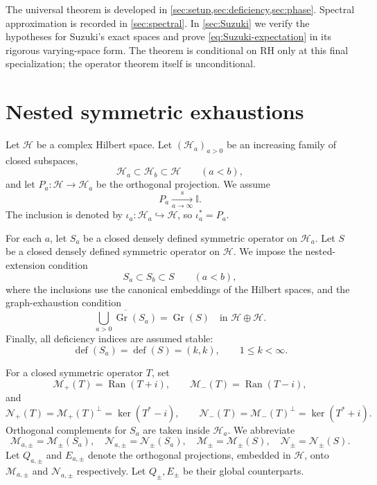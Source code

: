 \documentclass[11pt]{article}
\theoremstyle{remark}
\newcommand{\Hh}{\mathcal H}
\newcommand{\Ran}{\operatorname{Ran}}
\newcommand{\Gr}{\operatorname{Gr}}
\newcommand{\Id}{\mathbb I}
\begin{document}
The universal theorem is developed in \cref{sec:setup,sec:deficiency,sec:phase}.  Spectral
approximation is recorded in \cref{sec:spectral}.  In \cref{sec:Suzuki} we verify the hypotheses
for Suzuki's exact spaces and prove \eqref{eq:Suzuki-expectation} in its rigorous varying-space
form.  The theorem is conditional on RH only at this final specialization; the operator theorem
itself is unconditional.

\section{Nested symmetric exhaustions}\label{sec:setup}

Let $\Hh$ be a complex Hilbert space.  Let $(\Hh_a)_{a>0}$ be an increasing family of closed
subspaces,
\[
 \Hh_a\subset\Hh_b\subset\Hh\qquad (a<b),
\]
and let $P_a:\Hh\to\Hh_a$ be the orthogonal projection.  We assume
\begin{equation}\label{eq:Pa-strong}
 P_a\xrightarrow[a\to\infty]{\mathrm{s}}\Id.
\end{equation}
The inclusion is denoted by $\iota_a:\Hh_a\hookrightarrow\Hh$, so
$\iota_a^*=P_a$.

For each $a$, let $S_a$ be a closed densely defined symmetric operator on $\Hh_a$.  Let $S$ be a
closed densely defined symmetric operator on $\Hh$.  We impose the nested-extension condition
\begin{equation}\label{eq:nested-S}
 S_a\subset S_b\subset S\qquad(a<b),
\end{equation}
where the inclusions use the canonical embeddings of the Hilbert spaces, and the graph-exhaustion
condition
\begin{equation}\label{eq:graph-exhaust}
 \overline{\bigcup_{a>0}\Gr(S_a)}=\Gr(S)
 \quad\text{in }\Hh\oplus\Hh.
\end{equation}
Finally, all deficiency indices are assumed stable:
\begin{equation}\label{eq:stable-deficiency}
 \operatorname{def}(S_a)=\operatorname{def}(S)=(k,k),
 \qquad 1\leq k<\infty.
\end{equation}

For a closed symmetric operator $T$, set
\[
 \mathcal M_+(T)=\Ran(T+i),\qquad
 \mathcal M_-(T)=\Ran(T-i),
\]
and
\[
 \mathcal N_+(T)=\mathcal M_+(T)^\perp=\ker(T^*-i),\qquad
 \mathcal N_-(T)=\mathcal M_-(T)^\perp=\ker(T^*+i).
\]
Orthogonal complements for $S_a$ are taken inside $\Hh_a$.  We abbreviate
\[
 \mathcal M_{a,\pm}=\mathcal M_\pm(S_a),\quad
 \mathcal N_{a,\pm}=\mathcal N_\pm(S_a),\quad
 \mathcal M_\pm=\mathcal M_\pm(S),\quad
 \mathcal N_\pm=\mathcal N_\pm(S).
\]
Let $Q_{a,\pm}$ and $E_{a,\pm}$ denote the orthogonal projections, embedded in $\Hh$, onto
$\mathcal M_{a,\pm}$ and $\mathcal N_{a,\pm}$ respectively.  Let $Q_\pm,E_\pm$ be their global
counterparts.
\end{document}
